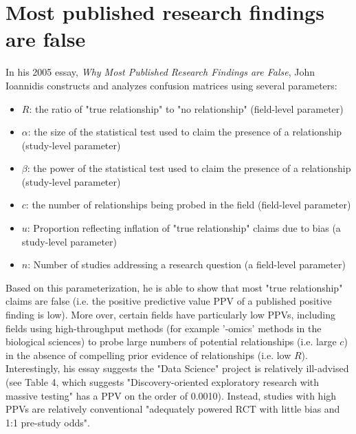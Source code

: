 \documentclass[paper=a4, fontsize=11pt]{scrartcl} %
\numberwithin{equation}{section} %
\numberwithin{figure}{section} %
\numberwithin{table}{section} %
\begin{document}

\section{Most published research findings are false}

In his 2005 essay, \emph{Why Most Published Research Findings are False}, John Ioannidis constructs and analyzes confusion matrices using several parameters:
\begin{itemize}
\item $R$: the ratio of "true relationship" to "no relationship" (field-level parameter)
\item $\alpha$: the size of the statistical test used to claim the presence of a relationship (study-level parameter)
\item $\beta$: the power of the statistical test used to claim the presence of a relationship (study-level parameter)
\item $c$: the number of relationships being probed in the field (field-level parameter)
\item $u$: Proportion reflecting inflation of "true relationship" claims due to bias (a study-level parameter)
\item $n$: Number of studies addressing a research question (a field-level parameter)
\end{itemize}
Based on this parameterization, he is able to show that most "true relationship" claims are false (i.e. the positive predictive value PPV of a published positive finding is low). More over, certain fields have particularly low PPVs, including fields using high-throughput methods (for example '-omics' methods in the biological sciences) to probe large numbers of potential relationships (i.e. large $c$) in the absence of compelling prior evidence of relationships (i.e. low $R$). Interestingly, his essay suggests the "Data Science" project is relatively ill-advised (see Table 4, which suggests "Discovery-oriented exploratory research with massive testing" has a PPV on the order of 0.0010). Instead, studies with high PPVs are relatively conventional "adequately powered RCT with little bias and 1:1 pre-study odds".

\end{document}
